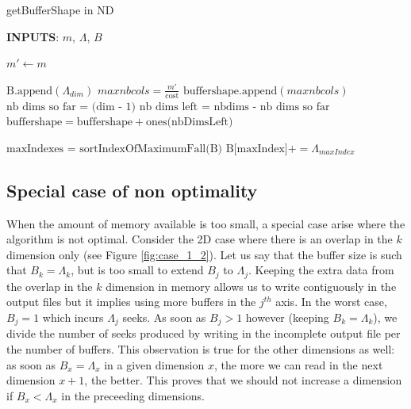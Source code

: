 \documentclass[conference]{IEEEtran}
\begin{document}
\begin{algorithm}[h]
  \caption{getBufferShape in ND}

  \begin{algorithmic}[1]

    \STATE \textbf{INPUTS}: $m$, $\Lambda$, $B$

    \STATE $m' \gets m$

        \STATE $\textrm{B.append}(\Lambda_{dim})$
      \ENDIF
        \STATE $maxnbcols = \frac{m'}{\textrm{cost}}$
	      \STATE $\textrm{buffershape.append}(maxnbcols)$
      \ENDIF
        \STATE $\textrm{nb dims so far = (dim - 1)}$
        \STATE $\textrm{nb dims left = nbdims - nb dims so far}$
        \STATE $\textrm{buffershape} = \textrm{buffershape} + \textrm{ones(nbDimsLeft)}$
      \ENDIF
    \ENDFOR

    \STATE $\textrm{maxIndexes = sortIndexOfMaximumFall(B)}$ %
        \STATE $\textrm{B[maxIndex]} += \Lambda_{maxIndex}$
      \ENDWHILE
    \ENDFOR

  \end{algorithmic}
  \label{algo:getbuffershape}

\end{algorithm}

\subsection{Special case of non optimality}
When the amount of memory available is too small, a special case arise where the algorithm is not optimal.
Consider the 2D case where there is an overlap in the $k$ dimension only (see Figure \ref{fig:case_1_2}).
Let us say that the buffer size is such that $B_k = \Lambda_k$, but is too small to extend $B_j$ to $\Lambda_j$.
Keeping the extra data from the overlap in the $k$ dimension in memory allows us to write contiguously in the output files but it implies using more buffers in the $j^{th}$ axis.
In the worst case, $B_j = 1$ which incurs $\Lambda_j$ seeks.
As soon as $B_j > 1$ however (keeping $B_k = \Lambda_k$), we divide the number of seeks produced by writing in the incomplete output file per the number of buffers.
This observation is true for the other dimensions as well: as soon as $B_x = \Lambda_x$ in a given dimension $x$, the more we can read in the next dimension $x+1$, the better.
This proves that we should not increase a dimension if $B_x < \Lambda_x$ in the preceeding dimensions.
\end{document}

